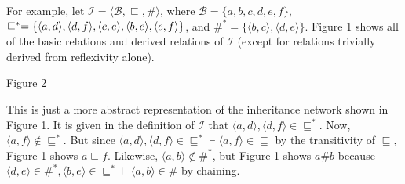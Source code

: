 For example, let $\mathcal{I}=\langle\mathcal{B},\sqsubseteq,\#\rangle$, where $\mathcal{B}=\{a,b,c,d,e,f\}$, $\sqsubseteq^*=\{\langle a,d\rangle,\langle d,f\rangle,\\ \langle c,e \rangle, \langle b,e\rangle,\langle e,f\rangle\}$, and $\#^*=\{\langle b,c\rangle,\langle d,e\rangle\}$. Figure 1 shows all of the basic relations and derived relations of $\mathcal{I}$ (except for relations trivially derived from reflexivity alone).
\par\vspace{5mm}
\centerline{
}
\vspace{3mm}
\centerline{Figure 2}

\par\vspace{5mm}
\noindent This is just a more abstract representation of the inheritance network shown in Figure 1. It is given in the definition of $\mathcal{I}$ that $\langle a,d\rangle,\langle d,f\rangle\in\sqsubseteq^*$. Now, $\langle a,f\rangle\notin\sqsubseteq^*$. But since $\langle a,d\rangle,\langle d,f\rangle\in\sqsubseteq^*\vdash\langle a,f\rangle\in\sqsubseteq$ by the transitivity of $\sqsubseteq$, Figure 1 shows $a\sqsubseteq f$. Likewise, $\langle a,b\rangle\notin\#^*$, but Figure 1 shows $a\#b$ because $\langle d,e\rangle\in\#^*,\langle b,e\rangle\in\sqsubseteq^*\vdash\langle a,b\rangle\in\#$ by chaining.

